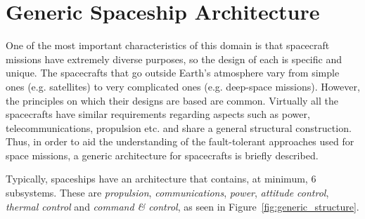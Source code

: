 \section{Generic Spaceship Architecture}
One of the most important characteristics of this domain is that spacecraft
missions have extremely diverse purposes, so the design of each is specific and
unique. The spacecrafts that go outside Earth's atmosphere vary from simple ones
(e.g. satellites) to very complicated ones (e.g. deep-space missions). However,
the principles on which their designs are based are common. Virtually all the
spacecrafts have similar requirements regarding aspects such as power,
telecommunications, propulsion etc. and share a general structural construction.
Thus, in order to aid the understanding of the fault-tolerant approaches used
for space missions, a generic architecture for spacecrafts is briefly described.

Typically, spaceships have an architecture that contains, at minimum, 6
subsystems\cite{ft-space-avionics}. These are \textit{propulsion},
\textit{communications}, \textit{power}, \textit{attitude control},
\textit{thermal control} and \textit{command \& control}, as seen in
Figure~\ref{fig:generic_structure}.

